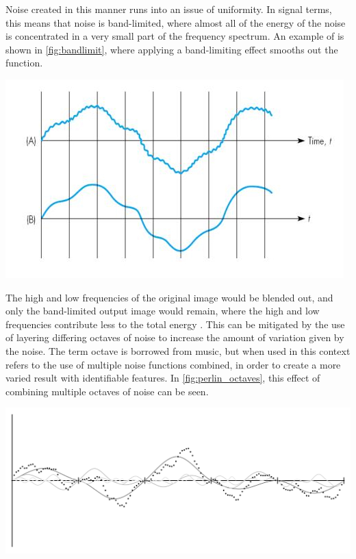 \documentclass[10pt]{report}
\begin{document}
		Noise created in this manner runs into an issue of uniformity. In signal terms, this means that noise is band-limited, where almost all of the energy of the noise is concentrated in a very small part of the frequency spectrum. An example of is shown in \autoref{fig:bandlimit}, where applying a band-limiting effect smooths out the function.
		
		\begin{minipage}{\textwidth}
			\centering
			\includegraphics[scale=.5]{bandlimiting-filter}
			\label{fig:bandlimit}
		\end{minipage}
		
		The high and low frequencies of the original image would be blended out, and only the band-limited output image would remain, where the high and low frequencies contribute less to the total energy \cite{making-noise}. This can be mitigated by the use of layering differing octaves of noise to increase the amount of variation given by the noise. The term octave is borrowed from music, but when used in this context refers to the use of multiple noise functions combined, in order to create a more varied result with identifiable features. In \autoref{fig:perlin_octaves}, this effect of combining multiple octaves of noise can be seen.
		
		\begin{minipage}{\textwidth}
			\centering
			\includegraphics[scale=.4]{perlin_octaves}
			\label{fig:perlin_octaves}
		\end{minipage}
	
\end{document}
